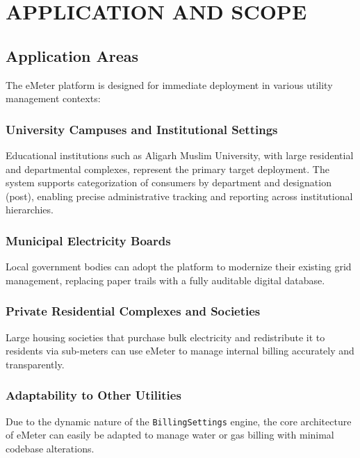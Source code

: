 \documentclass[12pt, a4paper, onecolumn]{report}
\begin{document}
\chapter{APPLICATION AND SCOPE}

\section{Application Areas}
The eMeter platform is designed for immediate deployment in various utility management contexts:

\subsection{University Campuses and Institutional Settings}
Educational institutions such as Aligarh Muslim University, with large residential and departmental complexes, represent the primary target deployment. The system supports categorization of consumers by department and designation (post), enabling precise administrative tracking and reporting across institutional hierarchies.

\subsection{Municipal Electricity Boards}
Local government bodies can adopt the platform to modernize their existing grid management, replacing paper trails with a fully auditable digital database.

\subsection{Private Residential Complexes and Societies}
Large housing societies that purchase bulk electricity and redistribute it to residents via sub-meters can use eMeter to manage internal billing accurately and transparently.

\subsection{Adaptability to Other Utilities}
Due to the dynamic nature of the \texttt{BillingSettings} engine, the core architecture of eMeter can easily be adapted to manage water or gas billing with minimal codebase alterations.
\end{document}
